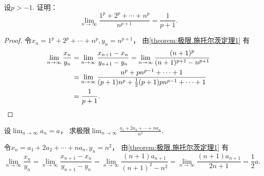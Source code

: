\begin{example}
设\(p>-1\).
证明：\begin{equation}\label{equation:数列极限.重要极限X}
	\lim_{n\to\infty} \frac{1^p+2^p+\dotsb+n^p}{n^{p+1}}
	= \frac{1}{p+1}.
\end{equation}
\begin{proof}
令\(x_n=1^p+2^p+\dotsb+n^p,
y_n=n^{p+1}\)，
由\cref{theorem:极限.施托尔茨定理1} 有\begin{align*}
	\lim_{n\to\infty} \frac{x_n}{y_n}
	&= \lim_{n\to\infty} \frac{x_{n+1}-x_n}{y_{n+1}-y_n}
	= \lim_{n\to\infty} \frac{(n+1)^p}{(n+1)^{p+1} - n^{p+1}} \\
	&= \lim_{n\to\infty} \frac{n^p + p n^{p-1} + \dotsb + 1}
		{(p+1) n^p + \frac{1}{2} (p+1) p n^{p-1} + \dotsb + 1} \\
	&= \frac{1}{p+1}.
	\qedhere
\end{align*}
\end{proof}
\end{example}

\begin{example}
设\(\lim_{n\to\infty} a_n = a\)，
求极限\(\lim_{n\to\infty} \frac{a_1+2a_2+\dotsb+na_n}{n^2}\).
\begin{solution}
令\(x_n=a_1+2a_2+\dotsb+na_n,
y_n=n^2\)，
由\cref{theorem:极限.施托尔茨定理1} 有\[
	\lim_{n\to\infty} \frac{x_n}{y_n}
	= \lim_{n\to\infty} \frac{x_{n+1}-x_n}{y_{n+1}-y_n}
	= \lim_{n\to\infty} \frac{(n+1)a_{n+1}}{(n+1)^2-n^2}
	= \lim_{n\to\infty} \frac{(n+1)a_{n+1}}{2n+1}
	= \frac12 a.
\]
\end{solution}
\end{example}
